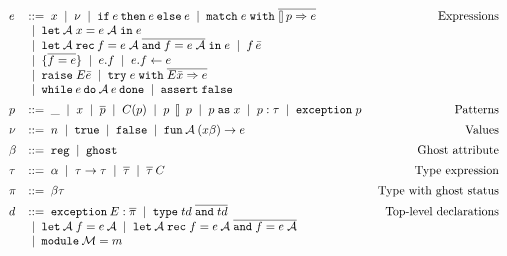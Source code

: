\documentclass{easychair}
\newcommand{\atts}{\mathcal{A}}
\begin{document}
\begin{figure}
  \centering
\[
  \begin{array}{llr}
    e & ::= \; x \sep \nu
        \sep \mathtt{if}\: e\: \mathtt{then}\: e\: \mathtt{else}\: e
        \sep \mathtt{match}\; e\; \mathtt{with}\;
        \overline{\talloblong\,p\Rightarrow e}
    & \alabel{Expressions}\\
      & \sep \mathtt{let} \: \atts \; x = e \; \atts \; \mathtt{in} \; e \\
      &  \sep \mathtt{let} \: \atts \; \mathtt{rec} \: f = e \; \atts \;
        \overline{\mathtt{and}\;f = e \; \atts} \; \mathtt{in} \; e
        \sep f\,\expbar \\
      & \sep \{ \overline{f = e} \} \sep e.f \sep e.f \leftarrow e \\
      & \sep \mathtt{raise} \; E\expbar
        \sep \mathtt{try} \; e \; \mathtt{with} \; \exbar \\
      & \sep \mathtt{while} \: e \: \mathtt{do} \: \atts \: e \: \mathtt{done}
        \sep \mathtt{assert\;false} \\[.5em]

    p & ::= \; \_ \sep x \sep \overline{p} \sep C (p)
        \sep p\: \talloblong\: p \sep p\;\mathtt{as}\;x \sep p : \tau
        \sep \mathtt{exception}\;p & \alabel{Patterns}\\[.5em]

    \nu & ::= \; n \sep \mathtt{true} \sep \mathtt{false} \sep
          \mathtt{fun}\:\atts\:(x\beta) \rightarrow e & \alabel{Values}\\[.5em]

    \beta & ::= \; \texttt{reg} \sep \texttt{ghost} & \alabel{Ghost attribute}
    \\[.5em]

    \tau & ::= \; \alpha \sep \tau\rightarrow\tau \sep \overline{\tau}
           \sep \overline{\tau}\:C & \alabel{Type expression} \\[.5em]

    \pi & ::= \; \beta\tau & \hspace{-40pt}
                             \alabel{Type with ghost status}\\[.5em]

    d & ::= \; \texttt{exception}\: E : \pibar
        \sep \texttt{type} \; td  \; \overline{\texttt{and}\; td}
    & \alabel{Top-level declarations} \\
      & \sep \mathtt{let}\: \atts \; f = e \: \atts
        \sep \mathtt{let}\: \atts \; \texttt{rec}\; f = e \: \atts\;
        \overline{\mathtt{and}\;f = e \; \atts}\\
      & \sep \texttt{module}\:\mathcal{M} = m\\[.5em]


\end{array}\]
\end{figure}
\end{document}
